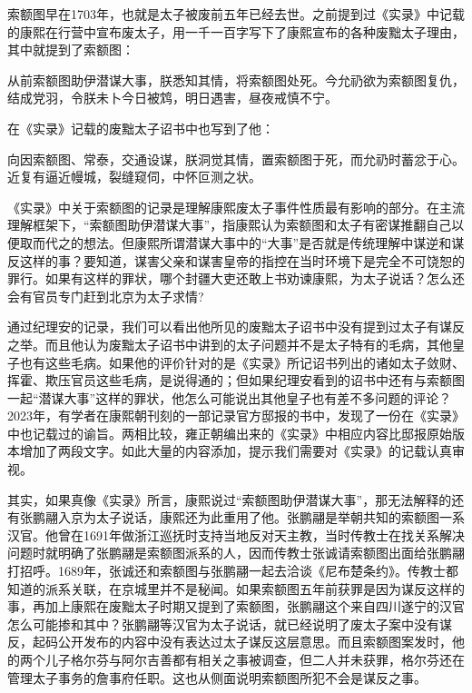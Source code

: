 
索额图早在1703年，也就是太子被废前五年已经去世。之前提到过《实录》中记载的康熙在行营中宣布废太子，用一千一百字写下了康熙宣布的各种废黜太子理由，其中就提到了索额图：



\begin{bookquote}从前索额图助伊潜谋大事，朕悉知其情，将索额图处死。今允礽欲为索额图复仇，结成党羽，令朕未卜今日被鸩，明日遇害，昼夜戒慎不宁。\end{bookquote}


在《实录》记载的废黜太子诏书中也写到了他：



\begin{bookquote}向因索额图、常泰，交通设谋，朕洞觉其情，置索额图于死，而允礽时蓄忿于心。近复有逼近幔城，裂缝窥伺，中怀叵测之状。\end{bookquote}


《实录》中关于索额图的记录是理解康熙废太子事件性质最有影响的部分。在主流理解框架下，“索额图助伊潜谋大事”，指康熙认为索额图和太子有密谋推翻自己以便取而代之的想法。但康熙所谓潜谋大事中的“大事”是否就是传统理解中谋逆和谋反这样的事？要知道，谋害父亲和谋害皇帝的指控在当时环境下是完全不可饶恕的罪行。如果有这样的罪状，哪个封疆大吏还敢上书劝谏康熙，为太子说话？怎么还会有官员专门赶到北京为太子求情?



通过纪理安的记录，我们可以看出他所见的废黜太子诏书中没有提到过太子有谋反之举。而且他认为废黜太子诏书中讲到的太子问题并不是太子特有的毛病，其他皇子也有这些毛病。如果他的评价针对的是《实录》所记诏书列出的诸如太子敛财、挥霍、欺压官员这些毛病，是说得通的；但如果纪理安看到的诏书中还有与索额图一起“潜谋大事”这样的罪状，他怎么可能说出其他皇子也有差不多问题的评论？2023年，有学者在康熙朝刊刻的一部记录官方邸报的书中，发现了一份在《实录》中也记载过的谕旨。两相比较，雍正朝编出来的《实录》中相应内容比邸报原始版本增加了两段文字。如此大量的内容添加，提示我们需要对《实录》的记载认真审视。



其实，如果真像《实录》所言，康熙说过“索额图助伊潜谋大事”，那无法解释的还有张鹏翮入京为太子说话，康熙还为此重用了他。张鹏翮是举朝共知的索额图一系汉官。他曾在1691年做浙江巡抚时支持当地反对天主教，当时传教士在找关系解决问题时就明确了张鹏翮是索额图派系的人，因而传教士张诚请索额图出面给张鹏翮打招呼。1689年，张诚还和索额图与张鹏翮一起去洽谈《尼布楚条约》。传教士都知道的派系关联，在京城里并不是秘闻。如果索额图五年前获罪是因为谋反这样的事，再加上康熙在废黜太子时期又提到了索额图，张鹏翮这个来自四川遂宁的汉官怎么可能掺和其中？张鹏翮等汉官为太子说话，就已经说明了废太子案中没有谋反，起码公开发布的内容中没有表达过太子谋反这层意思。而且索额图案发时，他的两个儿子格尔芬与阿尔吉善都有相关之事被调查，但二人并未获罪，格尔芬还在管理太子事务的詹事府任职。这也从侧面说明索额图所犯不会是谋反之事。


